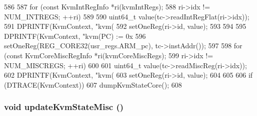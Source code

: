 \begin{DoxyCode}
586 {
587     for (const KvmIntRegInfo *ri(kvmIntRegs);
588          ri->idx != NUM_INTREGS; ++ri) {
589 
590         uint64_t value(tc->readIntRegFlat(ri->idx));
591         DPRINTF(KvmContext, "kvm(%
592         setOneReg(ri->id, value);
593     }
594 
595     DPRINTF(KvmContext, "kvm(PC) := 0x%
596     setOneReg(REG_CORE32(usr_regs.ARM_pc), tc->instAddr());
597 
598     for (const KvmCoreMiscRegInfo *ri(kvmCoreMiscRegs);
599          ri->idx != NUM_MISCREGS; ++ri) {
600 
601         uint64_t value(tc->readMiscReg(ri->idx));
602         DPRINTF(KvmContext, "kvm(%
603         setOneReg(ri->id, value);
604     }
605 
606     if (DTRACE(KvmContext))
607         dumpKvmStateCore();
608 }
\end{DoxyCode}
\hypertarget{classArmKvmCPU_a322cf85c38b68e9d2b62700eb61797f9}{
\subsubsection[{updateKvmStateMisc}]{\setlength{\rightskip}{0pt plus 5cm}void updateKvmStateMisc ()}}
\label{classArmKvmCPU_a322cf85c38b68e9d2b62700eb61797f9}



